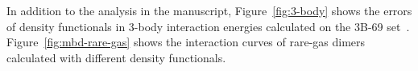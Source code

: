 \documentclass[twocolumn]{article}
\renewcommand\cite{\citep}
\begin{document}
In addition to the analysis in the manuscript, Figure~\ref{fig:3-body} shows the errors of density functionals in 3-body interaction energies calculated on the 3B-69 set~\cite{RezacJCTC15}.
Figure~\ref{fig:mbd-rare-gas} shows the interaction curves of rare-gas dimers calculated with different density functionals.

\begingroup
\renewcommand{\section}[2]{}
\setlength\bibsep{0pt}
\footnotesize

\endgroup
\end{document}

